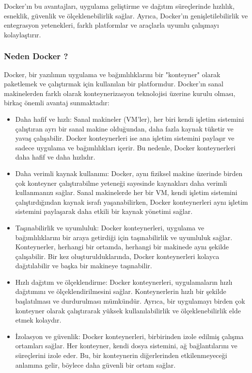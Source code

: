 Docker'ın bu avantajları, uygulama geliştirme ve dağıtım süreçlerinde hızlılık, esneklik, güvenlik ve ölçeklenebilirlik sağlar. Ayrıca, Docker'ın genişletilebilirlik ve entegrasyon yetenekleri, farklı platformlar ve araçlarla uyumlu çalışmayı kolaylaştırır.

\subsubsection{Neden Docker ?}
Docker, bir yazılımın uygulama ve bağımlılıklarını bir "konteyner" olarak paketlemek ve çalıştırmak için kullanılan bir platformdur. Docker'ın sanal makinelerden farklı olarak konteynerizasyon teknolojisi üzerine kurulu olması, birkaç önemli avantaj sunmaktadır:\\
\begin{itemize}
\item Daha hafif ve hızlı: Sanal makineler (VM'ler), her biri kendi işletim sistemini çalıştıran ayrı bir sanal makine olduğundan, daha fazla kaynak tüketir ve yavaş çalışabilir. Docker konteynerleri ise ana işletim sistemini paylaşır ve sadece uygulama ve bağımlılıkları içerir. Bu nedenle, Docker konteynerleri daha hafif ve daha hızlıdır.\\

\item Daha verimli kaynak kullanımı: Docker, aynı fiziksel makine üzerinde birden çok konteyner çalıştırabilme yeteneği sayesinde kaynakları daha verimli kullanmanızı sağlar. Sanal makinelerde her bir VM, kendi işletim sistemini çalıştırdığından kaynak israfı yaşanabilirken, Docker konteynerleri aynı işletim sistemini paylaşarak daha etkili bir kaynak yönetimi sağlar.\\

\item Taşınabilirlik ve uyumluluk: Docker konteynerleri, uygulama ve bağımlılıklarını bir araya getirdiği için taşınabilirlik ve uyumluluk sağlar. Konteynerler, herhangi bir ortamda, herhangi bir makinede aynı şekilde çalışabilir. Bir kez oluşturulduklarında, Docker konteynerleri kolayca dağıtılabilir ve başka bir makineye taşınabilir.\\

\item Hızlı dağıtım ve ölçeklendirme: Docker konteynerleri, uygulamaların hızlı dağıtımını ve ölçeklendirilmesini sağlar. Konteynerlerin hızlı bir şekilde başlatılması ve durdurulması mümkündür. Ayrıca, bir uygulamayı birden çok konteyner olarak çalıştırarak yüksek kullanılabilirlik ve ölçeklenebilirlik elde etmek kolaydır.\\

\item İzolasyon ve güvenlik: Docker konteynerleri, birbirinden izole edilmiş çalışma ortamları sağlar. Her konteyner, kendi dosya sistemini, ağ bağlantılarını ve süreçlerini izole eder. Bu, bir konteynerin diğerlerinden etkilenmeyeceği anlamına gelir, böylece daha güvenli bir ortam sağlar.\\
\end{itemize}
